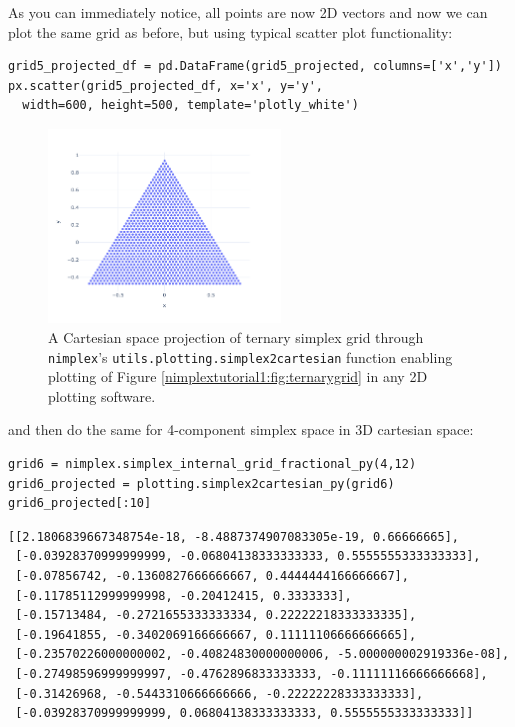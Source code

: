 As you can immediately notice, all points are now 2D vectors and now we
can plot the same grid as before, but using typical scatter plot
functionality:

\begin{verbatim}
grid5_projected_df = pd.DataFrame(grid5_projected, columns=['x','y'])
px.scatter(grid5_projected_df, x='x', y='y', 
  width=600, height=500, template='plotly_white')
\end{verbatim}

\begin{figure}[H]
    \centering
    \includegraphics[width=0.55\textwidth]{nimplexTutorial1/01.QuickStart_27_0.pdf}
    \caption{A Cartesian space projection of ternary simplex grid through \texttt{nimplex}'s \texttt{utils.plotting.}\texttt{simplex2cartesian} function enabling plotting of Figure \ref{nimplextutorial1:fig:ternarygrid} in any 2D plotting software.}
    \label{nimplextutorial1:fig:ternarygridprojected}
\end{figure}

and then do the same for 4-component simplex space in 3D cartesian
space:

\begin{verbatim}
grid6 = nimplex.simplex_internal_grid_fractional_py(4,12)
grid6_projected = plotting.simplex2cartesian_py(grid6)
grid6_projected[:10]
\end{verbatim}

\begin{verbatim}
[[2.1806839667348754e-18, -8.4887374907083305e-19, 0.66666665],
 [-0.03928370999999999, -0.06804138333333333, 0.5555555333333333],
 [-0.07856742, -0.1360827666666667, 0.4444444166666667],
 [-0.11785112999999998, -0.20412415, 0.3333333],
 [-0.15713484, -0.2721655333333334, 0.22222218333333335],
 [-0.19641855, -0.3402069166666667, 0.11111106666666665],
 [-0.23570226000000002, -0.40824830000000006, -5.000000002919336e-08],
 [-0.27498596999999997, -0.4762896833333333, -0.11111116666666668],
 [-0.31426968, -0.5443310666666666, -0.22222228333333333],
 [-0.03928370999999999, 0.06804138333333333, 0.5555555333333333]]
\end{verbatim}

